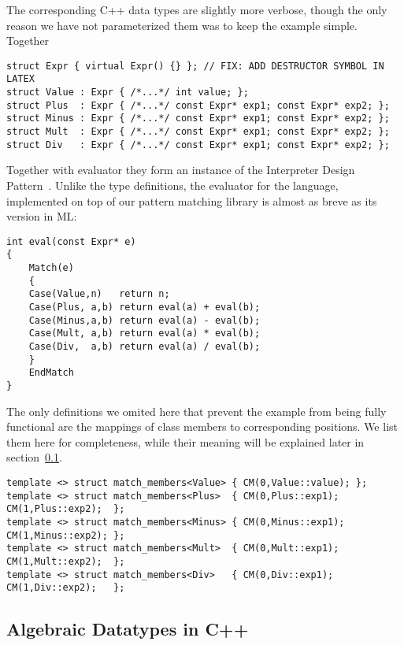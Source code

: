 \documentclass[submission,copyright]{eptcs}
\begin{document}
The corresponding C++ data types are slightly more verbose, though the only 
reason we have not parameterized them was to keep the example simple. Together

\begin{lstlisting}[keepspaces,columns=flexible]
struct Expr { virtual Expr() {} }; // FIX: ADD DESTRUCTOR SYMBOL IN LATEX
struct Value : Expr { /*...*/ int value; };
struct Plus  : Expr { /*...*/ const Expr* exp1; const Expr* exp2; };
struct Minus : Expr { /*...*/ const Expr* exp1; const Expr* exp2; };
struct Mult  : Expr { /*...*/ const Expr* exp1; const Expr* exp2; };
struct Div   : Expr { /*...*/ const Expr* exp1; const Expr* exp2; };
\end{lstlisting}

Together with evaluator they form an instance of the Interpreter Design 
Pattern~\cite{DesignPatterns1993}. Unlike the type definitions, the evaluator 
for the language, implemented on top of our pattern matching library is almost 
as breve as its version in ML:

\begin{lstlisting}[keepspaces,columns=flexible]
int eval(const Expr* e)
{
    Match(e)
    {
    Case(Value,n)   return n;
    Case(Plus, a,b) return eval(a) + eval(b);
    Case(Minus,a,b) return eval(a) - eval(b);
    Case(Mult, a,b) return eval(a) * eval(b);
    Case(Div,  a,b) return eval(a) / eval(b);
    }
    EndMatch
}
\end{lstlisting}

The only definitions we omited here that prevent the example from being fully 
functional are the mappings of class members to corresponding positions. We list 
them here for completeness, while their meaning will be explained later in 
section~\ref{}.

\begin{lstlisting}[keepspaces,columns=flexible]
template <> struct match_members<Value> { CM(0,Value::value); };
template <> struct match_members<Plus>  { CM(0,Plus::exp1);   CM(1,Plus::exp2);  };
template <> struct match_members<Minus> { CM(0,Minus::exp1);  CM(1,Minus::exp2); };
template <> struct match_members<Mult>  { CM(0,Mult::exp1);   CM(1,Mult::exp2);  };
template <> struct match_members<Div>   { CM(0,Div::exp1);    CM(1,Div::exp2);   };
\end{lstlisting}

\subsection{Algebraic Datatypes in C++}
\end{document}
